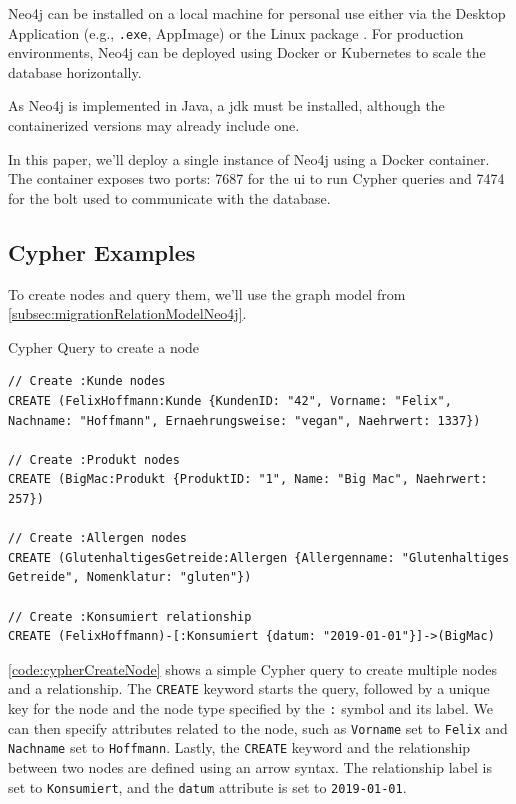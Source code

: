 Neo4j can be installed on a local machine for personal use either via the Desktop Application (e.g., \texttt{.exe}, AppImage) or the Linux package \parencite{neo4j_neo4j_nodate}. For production environments, Neo4j can be deployed using Docker \parencite{neo4j_docs_introduction_nodate} or Kubernetes to scale the database horizontally.

As Neo4j is implemented in Java, a \ac{jdk} must be installed, although the containerized versions may already include one.

In this paper, we'll deploy a single instance of Neo4j using a Docker container. The container exposes two ports: \num{7687} for the \ac{ui} to run Cypher queries and \num{7474} for the \ac{bolt} used to communicate with the database.

\subsection{Cypher Examples} \label{subsec:queryingNeo4j}

To create nodes and query them, we'll use the graph model from \autoref{subsec:migrationRelationModelNeo4j}.

\begin{code}[H]
    \caption{Cypher Query to create a node} \label{code:cypherCreateNode}
    \begin{verbatim}
// Create :Kunde nodes
CREATE (FelixHoffmann:Kunde {KundenID: "42", Vorname: "Felix", Nachname: "Hoffmann", Ernaehrungsweise: "vegan", Naehrwert: 1337})

// Create :Produkt nodes
CREATE (BigMac:Produkt {ProduktID: "1", Name: "Big Mac", Naehrwert: 257})

// Create :Allergen nodes
CREATE (GlutenhaltigesGetreide:Allergen {Allergenname: "Glutenhaltiges Getreide", Nomenklatur: "gluten"})

// Create :Konsumiert relationship
CREATE (FelixHoffmann)-[:Konsumiert {datum: "2019-01-01"}]->(BigMac)
    \end{verbatim}
\end{code}

\autoref{code:cypherCreateNode} shows a simple Cypher query to create multiple nodes and a relationship. The \texttt{CREATE} keyword starts the query, followed by a unique key for the node and the node type specified by the \texttt{:} symbol and its label. We can then specify attributes related to the node, such as \texttt{Vorname} set to \texttt{Felix} and \texttt{Nachname} set to \texttt{Hoffmann}. Lastly, the \texttt{CREATE} keyword and the relationship between two nodes are defined using an arrow syntax. The relationship label is set to \texttt{Konsumiert}, and the \texttt{datum} attribute is set to \texttt{2019-01-01}.

